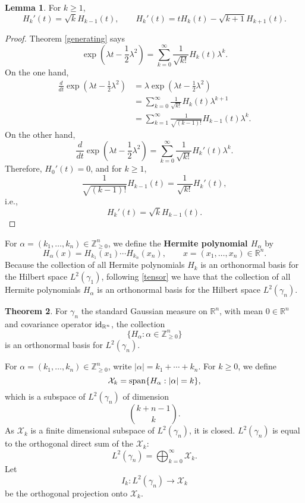 \documentclass{article}
\newcommand{\Span}{\ensuremath\mathrm{span}}
\newcommand{\id}{\ensuremath\mathrm{id}}
\theoremstyle{definition}
\newtheorem{theorem}{Theorem}
\newtheorem{lemma}[theorem]{Lemma}
\theoremstyle{definition}
\begin{document}
\begin{lemma}
For $k \geq 1$,
\[
H_k'(t) = \sqrt{k} H_{k-1}(t), \qquad H_k'(t)= tH_k(t) - \sqrt{k+1} H_{k+1}(t).
\]
\end{lemma}
\begin{proof}
Theorem \ref{generating} says
\[
\exp\left(\lambda t-\frac{1}{2}\lambda^2\right) = \sum_{k=0}^\infty  \frac{1}{\sqrt{k!}} H_k(t) \lambda^k.
\]
On the one hand,
\begin{align*}
\frac{d}{dt} \exp\left(\lambda t-\frac{1}{2}\lambda^2\right) &= \lambda \exp\left(\lambda t-\frac{1}{2}\lambda^2\right)\\
&=\sum_{k=0}^\infty  \frac{1}{\sqrt{k!}} H_k(t) \lambda^{k+1}\\
&=\sum_{k=1}^\infty \frac{1}{\sqrt{(k-1)!}} H_{k-1}(t) \lambda^k.
\end{align*}
On the other hand,
\[
\frac{d}{dt} \exp\left(\lambda t-\frac{1}{2}\lambda^2\right)  = \sum_{k=0}^\infty \frac{1}{\sqrt{k!}} H_k'(t) \lambda^k.
\]
Therefore,  $H_0'(t)=0$, and for $k \geq 1$,
\[
\frac{1}{\sqrt{(k-1)!}} H_{k-1}(t) =  \frac{1}{\sqrt{k!}} H_k'(t),
\]
i.e.,
\[
H_k'(t) = \sqrt{k} H_{k-1}(t).
\]
\end{proof}

For $\alpha=(k_1,\ldots,k_n) \in \mathbb{Z}_{\geq 0}^n$, we define the \textbf{Hermite polynomial $H_\alpha$} by
\[
H_\alpha(x) = H_{k_1}(x_1) \cdots H_{k_n}(x_n), \qquad x = (x_1,\ldots,x_n) \in \mathbb{R}^n.
\]
Because the collection of all Hermite polynomials $H_k$ is an orthonormal basis for the Hilbert space $L^2(\gamma_1)$, following
\eqref{tensor} we have that the collection of all Hermite polynomials $H_\alpha$ is an orthonormal basis for the Hilbert
space $L^2(\gamma_n)$. 

\begin{theorem}
For $\gamma_n$ the standard Gaussian measure on $\mathbb{R}^n$, with mean $0 \in \mathbb{R}^n$ and covariance operator
$\id_{\mathbb{R}^n}$,
the collection
\[
\{H_\alpha: \alpha \in \mathbb{Z}_{\geq 0}^n\}
\]
is an orthonormal basis for $L^2(\gamma_n)$.
\end{theorem}

For $\alpha=(k_1,\ldots,k_n) \in \mathbb{Z}_{\geq 0}^n$, write $|\alpha|=k_1+\cdots+k_n$. 
For $k \geq 0$, we define
\[
\mathcal{X}_k = \Span\{H_\alpha: |\alpha|=k\},
\]
which is a subspace of $L^2(\gamma_n)$ of dimension
\[
\binom{k+n-1}{k}.
\]
As $\mathcal{X}_k$ 
is a finite dimensional subspace of $L^2(\gamma_n)$, it is closed. 
$L^2(\gamma_n)$ is equal to the orthogonal direct sum of the $\mathcal{X}_k$:
\[
L^2(\gamma_n) = \bigoplus_{k=0}^\infty \mathcal{X}_k.
\]
Let 
\[
I_k:L^2(\gamma_n) \to \mathcal{X}_k
\]
 be the  orthogonal projection onto $\mathcal{X}_k$. 
\end{document}
